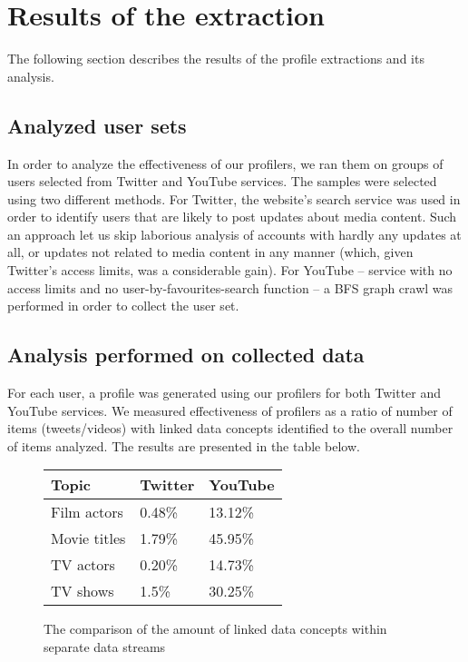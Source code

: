 \section{Results of the extraction}

The following section describes the results of the profile extractions and its
analysis.

\subsection{Analyzed user sets}
In order to analyze the effectiveness of our profilers, we ran them on groups of
users selected from Twitter and YouTube services. The samples were selected
using two different methods. For Twitter, the website's search service was used
in order to identify users that are likely to post updates about media content.
Such an approach let us skip laborious analysis of accounts with hardly any
updates at all, or updates not related to media content in any manner (which,
given Twitter's access limits, was a considerable gain). For YouTube -- service
with no access limits and no user-by-favourites-search function -- a BFS graph
crawl was performed in order to collect the user set.

\subsection{Analysis performed on collected data}

For each user, a profile was generated using our profilers for both Twitter and
YouTube services. We measured effectiveness of profilers as a ratio of number of
items (tweets/videos) with linked data concepts identified to the overall number
of items analyzed. The results are presented in the table below.

\begin{figure}[h!]
  \begin{center}
    \begin{tabular}{| l | l | l |}
    Topic & Twitter & YouTube \\ \hline
    Film actors & 0.48\% & 13.12\% \\
    Movie titles & 1.79\% & 45.95\% \\
    TV actors & 0.20\% & 14.73\% \\
    TV shows & 1.5\% & 30.25\% \\
    \end{tabular}
    \caption{The comparison of the amount of linked data concepts within separate data streams}
  \end{center}
\end{figure}

